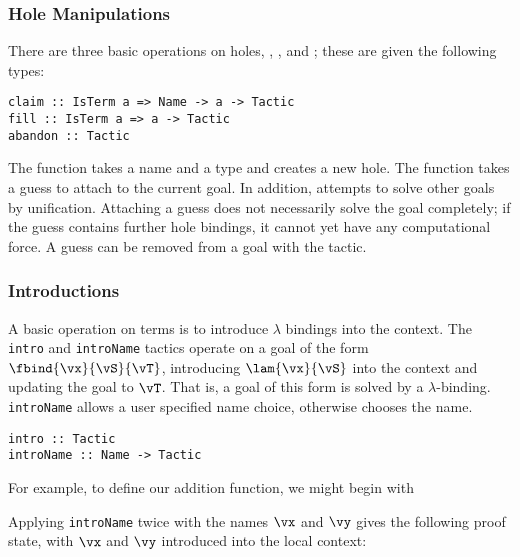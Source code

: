 \subsubsection{Hole Manipulations}
There are three basic operations on holes, , ,
and ; these are given the following types:
%
\begin{verbatim}
claim :: IsTerm a => Name -> a -> Tactic
fill :: IsTerm a => a -> Tactic
abandon :: Tactic
\end{verbatim}
%
The  function takes a name and a type and creates a new
hole. The  function takes a guess to attach to the current
goal. In addition,  attempts to solve other goals by
unification. Attaching a guess does not necessarily solve the goal
completely; if the guess contains further hole bindings, it cannot yet
have any computational force. 
A guess can be removed from a goal with the 
tactic.


\subsubsection{Introductions}
A basic operation on terms is to introduce $\lambda$ bindings into the
context. The \texttt{intro} and \texttt{introName} tactics operate on
a goal of the form $\fbind{\vx}{\vS}{\vT}$, introducing
$\lam{\vx}{\vS}$ into the context and updating the goal to
$\vT$. That is, a goal of this form is solved by a $\lambda$-binding.
\texttt{introName} allows a user specified name choice,
otherwise \Ivor{} chooses the name.
%
\begin{verbatim}
intro :: Tactic
introName :: Name -> Tactic
\end{verbatim}
%
For example, to define our addition function, we might begin with


Applying \texttt{introName} twice with the names $\vx$ and $\vy$ gives
the following proof state, with $\vx$ and $\vy$ introduced into the
local context:

